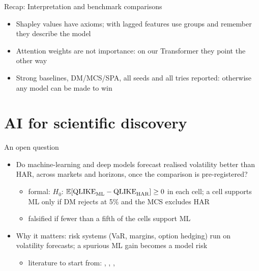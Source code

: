 \begin{frame}{Recap: Interpretation and benchmark comparisons}
\itemsize{\small}
\begin{itemize}
    \item Shapley values have axioms; with lagged features use groups and remember they describe the model
    \item Attention weights are not importance: on our Transformer they point the other way
    \item Strong baselines, DM/MCS/SPA, all seeds and all tries reported: otherwise any model can be made to win
\end{itemize}
\end{frame}


\section{AI for scientific discovery}

\begin{frame}{An open question}
\itemsize{\small}
\begin{itemize}
    \item Do machine-learning and deep models forecast realised volatility better than HAR, across markets and horizons, once the comparison is pre-registered?
    \begin{itemize}
        \item formal: $H_0$: $\mathbb{E}[\mathrm{QLIKE}_{\mathrm{ML}} - \mathrm{QLIKE}_{\mathrm{HAR}}] \ge 0$ in each cell; a cell supports ML only if DM rejects at 5\% and the MCS excludes HAR
        \item falsified if fewer than a fifth of the cells support ML
    \end{itemize}
    \item Why it matters: risk systems (VaR, margins, option hedging) run on volatility forecasts; a spurious ML gain becomes a model risk
    \begin{itemize}
        \item literature to start from: , , , 
    \end{itemize}
\end{itemize}
\end{frame}

